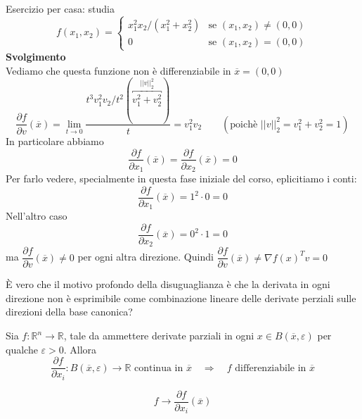 \begin{exercise}
\label{richiamibigi:exercise01}
Esercizio per casa: studia
$$
   f(x_1, x_2)= \begin{cases}x_1^2 x_2 / (x_1^2 + x_2^2)  
    & \mbox{se } (x_1, x_2) \neq (0,0)  \\
   0 & \mbox{se } (x_1,x_2) = (0,0)\end{cases}
$$
\textbf{Svolgimento} \\
Vediamo che questa funzione non \`e differenziabile in
$\overline{x} = (0,0)$
$$
\dfrac{\partial f}{\partial v} (\overline{x})
=
\lim_{t \to 0}
\dfrac{t^{3}v_1^{2}v_2 / t^{2}(\overbracket{v_1^{2} + v_2^{2}}^{||v||_2^{2}})}{t}
=
v_1^{2}v_2
 \qquad ( \text{poich\`e } ||v||_{2}^{2} = v_1^{2} + v_2^{2} = 1)
$$
In particolare abbiamo
$$\dfrac{\partial f}{\partial x_1} (\overline{x})
=
\dfrac{\partial f}{\partial x_2} (\overline{x})
=
0
$$
Per farlo vedere, specialmente in questa fase iniziale del corso,
eplicitiamo i conti:
$$\dfrac{\partial f}{\partial x_1} (\overline{x}) =
1^{2}\cdot 0  = 0
$$ 
Nell'altro caso
$$\dfrac{\partial f}{\partial x_2} (\overline{x}) =
0^{2}\cdot 1  = 0
$$ 
ma $\dfrac{\partial f}{\partial v} (\overline{x}) \neq 0$
per ogni altra direzione. Quindi
$
\dfrac{\partial f}{\partial v} (\overline{x})
\neq
\nabla f(x)^{T}v = 0
$ \\
\begin{openquestion}
\`E vero che il motivo profondo della disuguaglianza \`e che la derivata
in ogni direzione non \`e esprimibile come combinazione
lineare delle derivate perziali sulle direzioni della base canonica?
\end{openquestion}
\end{exercise}

\begin{theo}
\label{richiamibigi:differenzialetotale}
Sia $f:\mathbb{R}^n \to \mathbb{R}$, tale da ammettere derivate
parziali in ogni $x \in B(\overline{x},\varepsilon)$ per qualche
$\varepsilon > 0$. Allora
$$
\frac{\partial f}{\partial x_i}: B(\overline{x}, \varepsilon)
 \to \mathbb{R}  \text{  continua in  } \overline{x}
\quad  \Longrightarrow \quad f  \text{  differenziabile in  }
 \overline{x}
$$

$$f \to \frac{\partial f}{\partial x_i}(\overline{x})$$
\end{theo}

